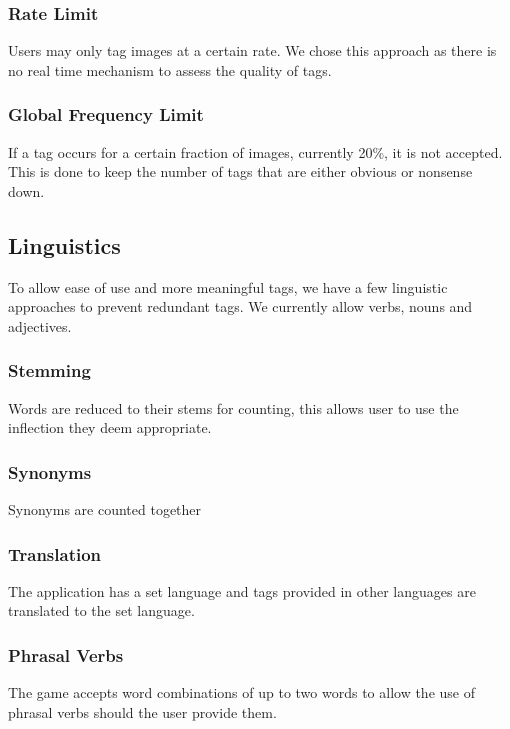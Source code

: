 \subsubsection{Rate Limit}
Users may only tag images at a certain rate. We chose this approach as there is no real time mechanism to assess the quality of tags.


\subsubsection{Global Frequency Limit}
If a tag occurs for a certain fraction of images, currently 20\%, it is not accepted. This is done to keep the number of tags that are either obvious or nonsense down.




\subsection{Linguistics}
To allow ease of use and more meaningful tags, we have a few linguistic approaches to prevent redundant tags. We currently allow verbs, nouns and adjectives.



\subsubsection{Stemming}
Words are reduced to their stems for counting, this allows user to use the inflection they deem appropriate.


\subsubsection{Synonyms}
Synonyms are counted together


\subsubsection{Translation}
The application has a set language and tags provided in other languages are translated to the set language.


\subsubsection{Phrasal Verbs}
The game accepts word combinations of up to two words to allow the use of phrasal verbs should the user provide them.


